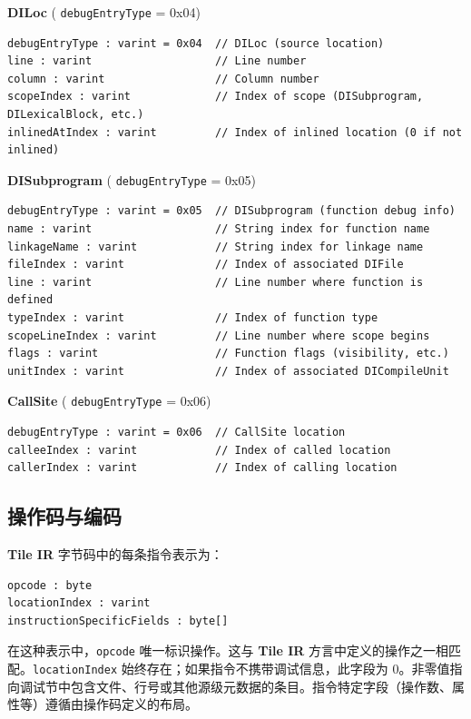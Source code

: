 \documentclass{article}
\begin{document}
\textbf{DILoc} ( \texttt{debugEntryType} = 0x04)


\begin{lstlisting}
debugEntryType : varint = 0x04  // DILoc (source location)
line : varint                   // Line number
column : varint                 // Column number
scopeIndex : varint             // Index of scope (DISubprogram, DILexicalBlock, etc.)
inlinedAtIndex : varint         // Index of inlined location (0 if not inlined)
\end{lstlisting}

\textbf{DISubprogram} ( \texttt{debugEntryType} = 0x05)


\begin{lstlisting}
debugEntryType : varint = 0x05  // DISubprogram (function debug info)
name : varint                   // String index for function name
linkageName : varint            // String index for linkage name
fileIndex : varint              // Index of associated DIFile
line : varint                   // Line number where function is defined
typeIndex : varint              // Index of function type
scopeLineIndex : varint         // Line number where scope begins
flags : varint                  // Function flags (visibility, etc.)
unitIndex : varint              // Index of associated DICompileUnit
\end{lstlisting}

\textbf{CallSite} ( \texttt{debugEntryType} = 0x06)


\begin{lstlisting}
debugEntryType : varint = 0x06  // CallSite location
calleeIndex : varint            // Index of called location
callerIndex : varint            // Index of calling location
\end{lstlisting}


\subsection{操作码与编码}

\textbf{Tile IR} 字节码中的每条指令表示为：


\begin{lstlisting}
opcode : byte
locationIndex : varint
instructionSpecificFields : byte[]
\end{lstlisting}

在这种表示中，\texttt{opcode} 唯一标识操作。这与 \textbf{Tile IR} 方言中定义的操作之一相匹配。\texttt{locationIndex} 始终存在；如果指令不携带调试信息，此字段为 0。非零值指向调试节中包含文件、行号或其他源级元数据的条目。指令特定字段（操作数、属性等）遵循由操作码定义的布局。
\end{document}
